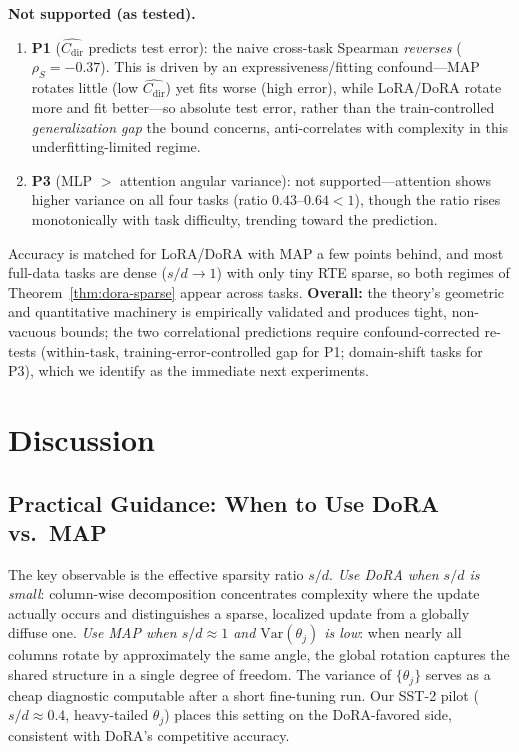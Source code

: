 \documentclass[11pt]{article}
\newcommand{\Cdir}{C_{\mathrm{dir}}}
\begin{document}
\noindent\textbf{Not supported (as tested).}
\begin{enumerate}[leftmargin=*,itemsep=1pt]
\item \textbf{P1} ($\widehat{\Cdir}$ predicts test error): the naive cross-task
Spearman \emph{reverses} ($\rho_S=-0.37$). This is driven by an expressiveness/fitting
confound---MAP rotates little (low $\widehat{\Cdir}$) yet fits worse (high error),
while LoRA/DoRA rotate more and fit better---so absolute test error, rather than the
train-controlled \emph{generalization gap} the bound concerns, anti-correlates with
complexity in this underfitting-limited regime.
\item \textbf{P3} (MLP $>$ attention angular variance): not supported---attention
shows higher variance on all four tasks (ratio $0.43$--$0.64<1$), though the ratio
rises monotonically with task difficulty, trending toward the prediction.
\end{enumerate}

\noindent Accuracy is matched for LoRA/DoRA with MAP a few points behind, and most
full-data tasks are dense ($s/d\to1$) with only tiny RTE sparse, so both regimes of
Theorem~\ref{thm:dora-sparse} appear across tasks. \textbf{Overall:} the theory's
geometric and quantitative machinery is empirically validated and produces tight,
non-vacuous bounds; the two correlational predictions require confound-corrected
re-tests (within-task, training-error-controlled gap for P1; domain-shift tasks for
P3), which we identify as the immediate next experiments.
\section{Discussion}

\subsection{Practical Guidance: When to Use DoRA vs.\ MAP}
The key observable is the effective sparsity ratio $s/d$. \emph{Use DoRA when $s/d$
is small}: column-wise decomposition concentrates complexity where the update
actually occurs and distinguishes a sparse, localized update from a globally diffuse
one. \emph{Use MAP when $s/d\approx1$ and $\mathrm{Var}(\theta_j)$ is low}: when
nearly all columns rotate by approximately the same angle, the global rotation
captures the shared structure in a single degree of freedom. The variance of
$\{\theta_j\}$ serves as a cheap diagnostic computable after a short fine-tuning run.
Our SST-2 pilot ($s/d\approx0.4$, heavy-tailed $\theta_j$) places this setting on the
DoRA-favored side, consistent with DoRA's competitive accuracy.
\end{document}
